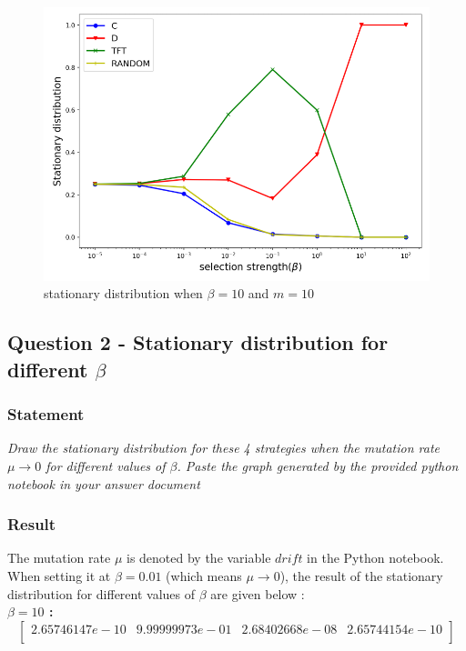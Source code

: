 \documentclass{article}
\begin{document}
\begin{figure}[h]
  \centering
  \includegraphics[scale=0.46]{figures/stationary-beta10.png}
  \caption{stationary distribution when $\beta = 10$ and $m=10$}
  \label{fig:stationary-beta10}
\end{figure}

\subsection{Question 2 - Stationary distribution for different $\beta$}

\subsubsection*{Statement}

\textit{Draw the stationary	distribution for these 4 strategies	when the mutation rate $\mu \rightarrow 0$ for different values of $\beta$.	 Paste the graph generated by the provided	python notebook in your	answer document}

\subsubsection{Result}
The mutation rate $\mu$ is denoted by the variable $drift$ in the Python notebook. When setting it at \textbf{$\beta = 0.01$} (which means $\mu \rightarrow 0$), the result of the stationary distribution for different values of $\beta$ are given below : \\

\textbf{$\beta = 10$ :} 
$$
\begin{bmatrix} 
 2.65746147e-10  & 9.99999973e-01 &  2.68402668e-08 &  2.65744154e-10 \\
\end{bmatrix}
$$
\end{document}
